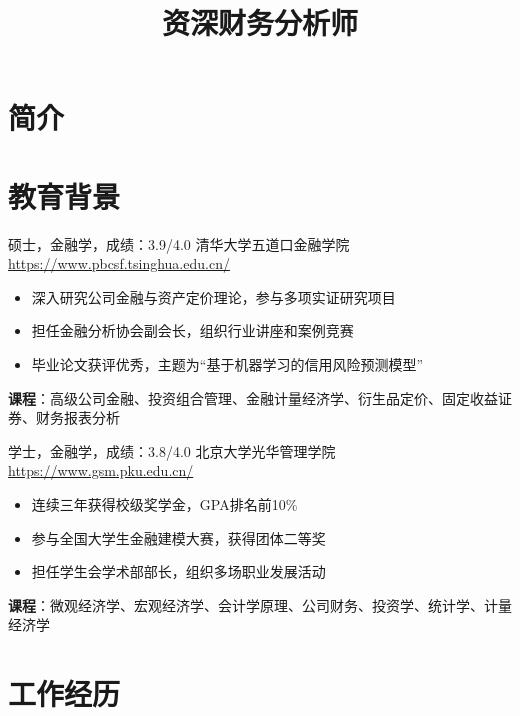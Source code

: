 \documentclass[a4paper, serif, 10pt]{moderncv}
\title{资深财务分析师}
\begin{document}
\maketitle

\section{简介}

\section{教育背景}

        {硕士，金融学，成绩：3.9/4.0}
        {清华大学五道口金融学院}
        {\url{https://www.pbcsf.tsinghua.edu.cn/}}
        {}
        {\begin{itemize}
\item 深入研究公司金融与资产定价理论，参与多项实证研究项目
\item 担任金融分析协会副会长，组织行业讲座和案例竞赛
\item 毕业论文获评优秀，主题为“基于机器学习的信用风险预测模型”
\end{itemize}
\textbf{课程}：高级公司金融、投资组合管理、金融计量经济学、衍生品定价、固定收益证券、财务报表分析}

        {学士，金融学，成绩：3.8/4.0}
        {北京大学光华管理学院}
        {\url{https://www.gsm.pku.edu.cn/}}
        {}
        {\begin{itemize}
\item 连续三年获得校级奖学金，GPA排名前10\%
\item 参与全国大学生金融建模大赛，获得团体二等奖
\item 担任学生会学术部部长，组织多场职业发展活动
\end{itemize}
\textbf{课程}：微观经济学、宏观经济学、会计学原理、公司财务、投资学、统计学、计量经济学}
\section{工作经历}
\end{document}
